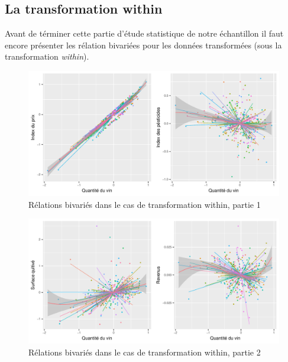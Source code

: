 \documentclass[11pt,]{article}
\begin{document}
\FloatBarrier

\hypertarget{la-transformation-within}{%
\subsection{\texorpdfstring{La transformation
\textbf{within}}{La transformation within}}\label{la-transformation-within}}

Avant de términer cette partie d'étude statistique de notre échantillon
il faut encore présenter les rélation bivariées pour les données
transformées (sous la transformation \emph{within}).

\FloatBarrier

\begin{figure}[!htbp]

{\centering \includegraphics{note2pres_files/figure-latex/unnamed-chunk-30-1} 

}

\caption{Rélations bivariés dans le cas de transformation within, partie 1}\label{fig:unnamed-chunk-30}
\end{figure}

\FloatBarrier

\begin{figure}[!htbp]

{\centering \includegraphics{note2pres_files/figure-latex/unnamed-chunk-31-1} 

}

\caption{Rélations bivariés dans le cas de transformation within, partie 2}\label{fig:unnamed-chunk-31}
\end{figure}
\end{document}
